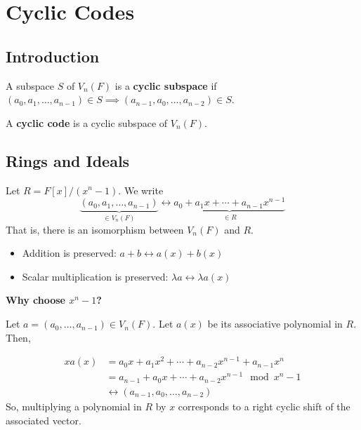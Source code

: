\chapter{Cyclic Codes}
\section{Introduction}
\begin{defbox}
    \begin{definition}
        A subspace $ S $ of $ V_n(F) $ is a \textbf{cyclic subspace}
        if $ (a_0,a_1,\ldots ,a_{n-1})\in S\implies
            (a_{n-1},a_0,\ldots , a_{n-2})\in S $.
    \end{definition}
\end{defbox}

\begin{defbox}
    \begin{definition}
        A \textbf{cyclic code} is a cyclic subspace of $ V_n(F) $.
    \end{definition}
\end{defbox}

\section{Rings and Ideals}

Let $ R=F[x]/(x^n-1) $. We write
\[ \underbrace{(a_0,a_1,\ldots ,a_{n-1})}_{\in V_n(F)}
    \longleftrightarrow \underbrace{{a_0+a_1x+\cdots+a_{n-1}}x^{n-1}}_{\in R} \]
That is, there is an isomorphism between $ V_n(F) $ and $ R $.
\begin{itemize}
    \item Addition is preserved: $ a+b\longleftrightarrow a(x)+b(x) $
    \item Scalar multiplication is preserved: $ \lambda a \longleftrightarrow \lambda a(x) $
\end{itemize}
\textbf{Why choose $ x^n -1$?}

Let $ a=(a_0,\ldots ,a_{n-1})\in V_n(F) $. Let $ a(x) $ be its associative
polynomial in $ R $. Then,

\begin{align*}
    x a(x)
     & =a_0x+a_1x^2+\cdots+a_{n-2}x^{n-1}+a_{n-1}x^n     \\
     & = a_{n-1}+a_0x+\cdots+a_{n-2}x^{n-1} \mod x^n -1  \\
     & \longleftrightarrow (a_{n-1},a_0,\ldots ,a_{n-2})
\end{align*}
So, multiplying a polynomial in $ R $ by $ x $ corresponds
to a right cyclic shift of the associated vector.


